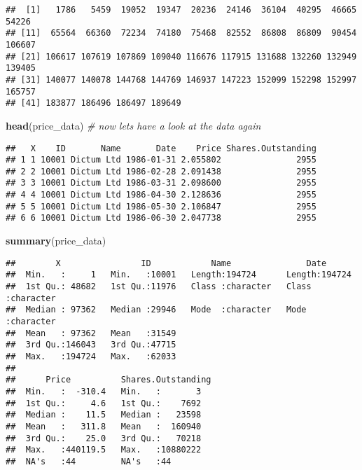 \documentclass[
]{article}
\newenvironment{Shaded}{\begin{snugshade}}{\end{snugshade}}
\newcommand{\CommentTok}[1]{\textcolor[rgb]{0.56,0.35,0.01}{\textit{#1}}}
\newcommand{\FunctionTok}[1]{\textcolor[rgb]{0.13,0.29,0.53}{\textbf{#1}}}
\newcommand{\NormalTok}[1]{#1}
\newcommand{\SpecialCharTok}[1]{\textcolor[rgb]{0.81,0.36,0.00}{\textbf{#1}}}
\begin{document}
\begin{Shaded}
\end{Shaded}

\begin{verbatim}
##  [1]   1786   5459  19052  19347  20236  24146  36104  40295  46665  54226
## [11]  65564  66360  72234  74180  75468  82552  86808  86809  90454 106607
## [21] 106617 107619 107869 109040 116676 117915 131688 132260 132949 139405
## [31] 140077 140078 144768 144769 146937 147223 152099 152298 152997 165757
## [41] 183877 186496 186497 189649
\end{verbatim}

\begin{Shaded}
\begin{Highlighting}[]
\FunctionTok{head}\NormalTok{(price\_data) }\CommentTok{\# now let\textquotesingle{}s have a look at the data again}
\end{Highlighting}
\end{Shaded}

\begin{verbatim}
##   X    ID       Name       Date    Price Shares.Outstanding
## 1 1 10001 Dictum Ltd 1986-01-31 2.055802               2955
## 2 2 10001 Dictum Ltd 1986-02-28 2.091438               2955
## 3 3 10001 Dictum Ltd 1986-03-31 2.098600               2955
## 4 4 10001 Dictum Ltd 1986-04-30 2.128636               2955
## 5 5 10001 Dictum Ltd 1986-05-30 2.106847               2955
## 6 6 10001 Dictum Ltd 1986-06-30 2.047738               2955
\end{verbatim}

\begin{Shaded}
\begin{Highlighting}[]
\FunctionTok{summary}\NormalTok{(price\_data)}
\end{Highlighting}
\end{Shaded}

\begin{verbatim}
##        X                ID            Name               Date          
##  Min.   :     1   Min.   :10001   Length:194724      Length:194724     
##  1st Qu.: 48682   1st Qu.:11976   Class :character   Class :character  
##  Median : 97362   Median :29946   Mode  :character   Mode  :character  
##  Mean   : 97362   Mean   :31549                                        
##  3rd Qu.:146043   3rd Qu.:47715                                        
##  Max.   :194724   Max.   :62033                                        
##                                                                        
##      Price          Shares.Outstanding
##  Min.   :  -310.4   Min.   :       3  
##  1st Qu.:     4.6   1st Qu.:    7692  
##  Median :    11.5   Median :   23598  
##  Mean   :   311.8   Mean   :  160940  
##  3rd Qu.:    25.0   3rd Qu.:   70218  
##  Max.   :440119.5   Max.   :10880222  
##  NA's   :44         NA's   :44
\end{verbatim}
\end{document}
